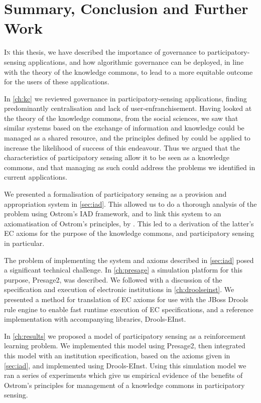 \acresetall
\chapter{Summary, Conclusion and Further Work}\label{ch:conc}

\lettrine[lines=3]{I}{n} this thesis, we have described the importance of
governance to participatory-sensing applications, and how algorithmic
governance can be deployed, in line with the theory of the knowledge commons,
to lead to a more equitable outcome for the users of these applications.

In \autoref{ch:kc} we reviewed governance in participatory-sensing
applications, finding predominantly centralisation and lack of 
user-enfranchisement. Having looked at the theory of the knowledge commons, from
the social sciences, we saw that similar systems based on the exchange of
information and knowledge could be managed as a shared resource, and the
principles defined by \citet{Ostrom1990} could be applied to increase the
likelihood of success of this endeavour. Thus we argued that the
characteristics of participatory sensing allow it to be seen as a knowledge
commons, and that managing as such could address the problems we identified in
current applications.

We presented a formalisation of participatory sensing as a provision and
appropriation system in \autoref{sec:iad}. This allowed us to do a thorough
analysis of the problem using Ostrom's \ac{IAD} framework, and to link this
system to an axiomatisation of Ostrom's principles, by \citet{Pitt2012b}. This
led to a derivation of the latter's \ac{EC} axioms for the purpose of the
knowledge commons, and participatory sensing in particular.

The problem of implementing the system and axioms described in
\autoref{sec:iad} posed a significant technical challenge. In
\autoref{ch:presage} a simulation platform for this purpose, Presage2, was
described. We followed with a discussion of the specification and execution of
electronic institutions in \autoref{ch:droolseinst}. We presented a method for
translation of \ac{EC} axioms for use with the JBoss Drools rule engine to
enable fast runtime execution of \ac{EC} specifications, and a reference
implementation with accompanying libraries, Drools-EInst.

In \autoref{ch:results} we proposed a model of participatory sensing as a
reinforcement learning problem. We implemented this model using Presage2, then
integrated this model with an institution specification, based on the axioms
given in \autoref{sec:iad}, and implemented using Drools-EInst. Using this
simulation model we ran a series of experiments which give us empirical
evidence of the benefits of Ostrom's principles for management of a knowledge
commons in participatory sensing.

